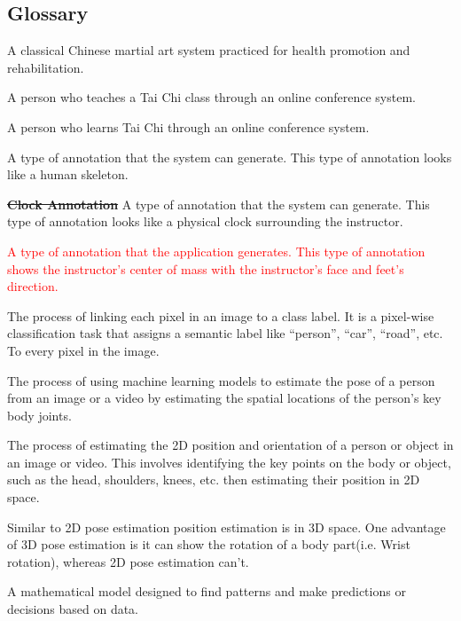 \documentclass[12pt]{article}
\begin{document}
\subsection{Glossary}\label{Glossary}
\begin{description}
    \item[Tai Chi] A classical Chinese martial art system practiced for health promotion and rehabilitation.
    \item[Instructor] A person who teaches a Tai Chi class through an online conference system.
    \item[Practitioner] A person who learns Tai Chi through an online conference system.
    \item[Skeleton Annotation] A type of annotation that the system can generate. This type of annotation looks like a human skeleton.
    \item\sout{\textbf{Clock Annotation}} A type of annotation that the system can generate. This type of annotation looks like a physical clock surrounding the instructor.
    \item[\textcolor{red}{Center of Mass Visualization}] \textcolor{red}{A type of annotation that the application generates. This type of annotation shows the instructor’s center of mass with the instructor's face and feet's direction.}
    \item[Semantic Segmentation] The process of linking each pixel in an image to a class label. It is a pixel-wise classification task that assigns a semantic label like “person”, “car”, “road”, etc. To every pixel in the image.
    \item[Pose Estimation/Extraction] The process of using machine learning models to estimate the pose of a person from an image or a video by estimating the spatial locations of the person’s key body joints.
    \item[2D Pose Estimation] The process of estimating the 2D position and orientation of a person or object in an image or video. This involves identifying the key points on the body or object, such as the head, shoulders, knees, etc. then estimating their position in  2D space.
    \item[3D Pose Estimation] Similar to 2D pose estimation position estimation is in 3D space. One advantage of 3D pose estimation is it can show the rotation of a body part(i.e. Wrist rotation), whereas 2D pose estimation can’t.
    \item[Machine Learning Model] A mathematical model designed to find patterns and make predictions or decisions based on data.

\end{description}
\end{document}
